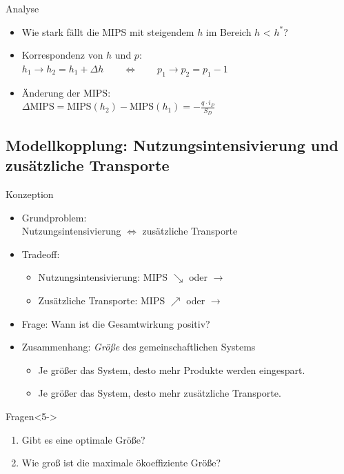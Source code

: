 \documentclass[beamer, xcolor={table,usenames,dvipsnames}]{beamer}
\begin{document}
	\begin{frame}{Analyse}		
		\begin{itemize}
			\item<1-> Wie stark fällt die MIPS mit steigendem $h$ im Bereich $h$ < $h^*$?
			\item<2-> Korrespondenz von $h$ und $p$: \\ $h_1 \rightarrow h_2 = h_1 + \Delta h \qquad \Leftrightarrow \qquad p_1 \rightarrow p_2 = p_1 -1$
			\item<3-> Änderung der MIPS: \\ $\Delta \text{MIPS} = \text{MIPS}(h_2) - \text{MIPS}(h_1) = - \frac{q \cdot i_P}{S_D}$
		\end{itemize}
		\begin{center}
			\resizebox{0.5\linewidth}{!}{
				
			}
		\end{center}
	\end{frame}

    \subsection{Modellkopplung: Nutzungsintensivierung und zusätzliche Transporte}
    \frame{\subsectionpage}
    
    \begin{frame}{Konzeption}
    	\begin{itemize}
    		\item<1-> Grundproblem: \\ Nutzungsintensivierung $\Leftrightarrow$ zusätzliche Transporte
    		\item<2-> Tradeoff:
	    		\begin{itemize}
	    			\item Nutzungsintensivierung: MIPS $\searrow$ oder $\rightarrow$
	    			\item Zusätzliche Transporte: MIPS $\nearrow$ oder $\rightarrow$
	    		\end{itemize}
    		\item<3-> Frage: Wann ist die Gesamtwirkung positiv? \\[1em]
    		\item<4-> Zusammenhang: \emph{Größe} des gemeinschaftlichen Systems
	    		\begin{itemize}
	    			\item Je größer das System, desto mehr Produkte werden eingespart.
	    			\item Je größer das System, desto mehr zusätzliche Transporte.
	    		\end{itemize}
    	\end{itemize}
    	\begin{block}{Fragen}<5->
			\begin{enumerate}
			    \item Gibt es eine optimale Größe?
			    \item Wie groß ist die maximale ökoeffiziente Größe?
			\end{enumerate}
    	\end{block}
    \end{frame}
    
\end{document}
